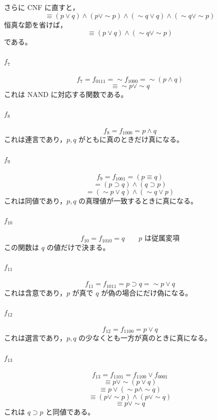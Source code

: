 \documentclass[../main.tex]{subfiles}
\begin{document}
さらに CNF に直すと，
\[
  \equiv
  (p \lor q)
  \land
  (p \lor \sim p)
  \land
  (\sim q \lor q)
  \land
  (\sim q \lor \sim p)
\]
恒真な節を省けば，
\[
  \equiv
  (p \lor q)
  \land
  (\sim q \lor \sim p)
\]
である。

\paragraph{\texorpdfstring{\(f_7\)}{f7}}
\[
  f_7
  =
  f_{0111}
  =
  \sim f_{1000}
  =
  \sim(p \land q)
\]
\[
  \equiv
  \sim p \lor \sim q
\]
これは NAND に対応する関数である。

\paragraph{\texorpdfstring{\(f_8\)}{f8}}
\[
  f_8
  =
  f_{1000}
  =
  p \land q
\]
これは連言であり，\(p,q\) がともに真のときだけ真になる。

\paragraph{\texorpdfstring{\(f_9\)}{f9}}
\[
  f_9
  =
  f_{1001}
  =
  (p \equiv q)
\]
\[
  =
  (p \supset q) \land (q \supset p)
\]
\[
  =
  (\sim p \lor q) \land (\sim q \lor p)
\]
これは同値であり，\(p,q\) の真理値が一致するときに真になる。

\paragraph{\texorpdfstring{\(f_{10}\)}{f10}}
\[
  f_{10}
  =
  f_{1010}
  =
  q
  \qquad
  p \text{ は従属変項}
\]
この関数は \(q\) の値だけで決まる。

\paragraph{\texorpdfstring{\(f_{11}\)}{f11}}
\[
  f_{11}
  =
  f_{1011}
  =
  p \supset q
  =
  \sim p \lor q
\]
これは含意であり，\(p\) が真で \(q\) が偽の場合にだけ偽になる。

\paragraph{\texorpdfstring{\(f_{12}\)}{f12}}
\[
  f_{12}
  =
  f_{1100}
  =
  p \lor q
\]
これは選言であり，\(p,q\) の少なくとも一方が真のときに真になる。

\paragraph{\texorpdfstring{\(f_{13}\)}{f13}}
\[
  f_{13}
  =
  f_{1101}
  =
  f_{1100} \lor f_{0001}
\]
\[
  \equiv
  p \lor \sim(p \lor q)
\]
\[
  \equiv
  p \lor (\sim p \land \sim q)
\]
\[
  \equiv
  (p \lor \sim p) \land (p \lor \sim q)
\]
\[
  \equiv
  p \lor \sim q
\]
これは \(q \supset p\) と同値である。
\end{document}
